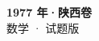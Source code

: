 \documentclass[zihao=-4, a4paper]{ctexart}
\begin{document}
\begin{center}
  {\Large\bfseries 1977 年·陕西卷}\\[4pt]
  {\large 数学 · 试题版}
\end{center}
\medskip
{}

\end{document}
